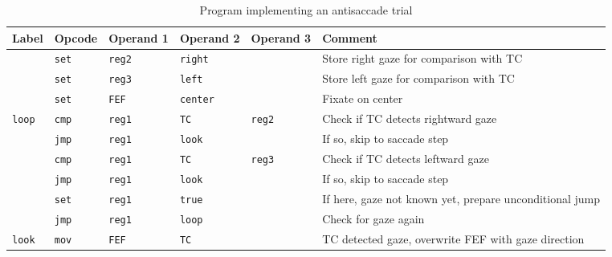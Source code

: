 \documentclass[pdftex,12pt,letterpaper]{article}
\begin{document}
\begin{table}[H]
\begin{tabularx}{\textwidth}{lllllX}
Label & Opcode & Operand 1 & Operand 2 & Operand 3 & Comment \\
\hline
    & \texttt{set} & \texttt{reg2} & \texttt{right} & & Store right gaze for comparison with TC \\
    & \texttt{set} & \texttt{reg3} & \texttt{left} & & Store left gaze for comparison with TC \\
 & \texttt{set} & \texttt{FEF} & \texttt{center} & & Fixate on center \\
\texttt{loop} & \texttt{cmp} & \texttt{reg1} & \texttt{TC} & \texttt{reg2} & Check if TC detects rightward gaze \\
    & \texttt{jmp} & \texttt{reg1} & \texttt{look} & & If so, skip to saccade step \\
    & \texttt{cmp} & \texttt{reg1} & \texttt{TC} & \texttt{reg3} & Check if TC detects leftward gaze \\
    & \texttt{jmp} & \texttt{reg1} & \texttt{look} & & If so, skip to saccade step \\
    & \texttt{set} & \texttt{reg1} & \texttt{true} & & If here, gaze not known yet, prepare unconditional jump \\
    & \texttt{jmp} & \texttt{reg1} & \texttt{loop} & & Check for gaze again \\
\texttt{look} & \texttt{mov} & \texttt{FEF} & \texttt{TC} & & TC detected gaze, overwrite FEF with gaze direction \\
\end{tabularx}
\caption{Program implementing an antisaccade trial}
\label{tbl:aas}
\end{table}
\end{document}
